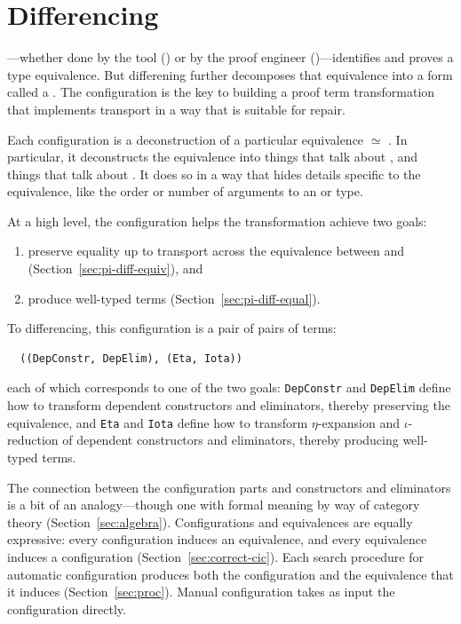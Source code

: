 \section{Differencing}
\label{sec:pi-diff}

---whether done by the tool () or by the proof engineer ()---identifies 
and proves a type equivalence. But differening further decomposes that equivalence into a form called a . 
The configuration is the key to building a proof term transformation that implements transport in a way that is suitable for repair.

Each configuration is a deconstruction of a particular equivalence \Aa $\simeq$ \B.
In particular, it deconstructs the equivalence into things that talk about \Aa, and things that talk about \B.
It does so in a way that hides details
specific to the equivalence, like the order or number of arguments to an  or type.

At a high level, the configuration helps the transformation achieve two goals: 

\begin{enumerate}
\item preserve equality up to transport across the equivalence between \Aa and \B (Section~\ref{sec:pi-diff-equiv}), and 
\item produce well-typed terms (Section~\ref{sec:pi-diff-equal}).
\end{enumerate}
To differencing, this configuration is a pair of pairs of terms:

\begin{lstlisting}
  ((DepConstr, DepElim), (Eta, Iota))
\end{lstlisting}
each of which corresponds to one of the two goals:
\lstinline{DepConstr} and \lstinline{DepElim} define how to transform dependent constructors and eliminators, thereby preserving the equivalence, and 
\lstinline{Eta} and \lstinline{Iota} define how to transform $\eta$-expansion and $\iota$-reduction of dependent constructors and eliminators, thereby producing well-typed terms.

The connection between the configuration parts and constructors and eliminators is a bit of an analogy---though one with formal meaning by way of
category theory (Section~\ref{sec:algebra}).
Configurations and equivalences are equally expressive: every configuration induces an equivalence, and every equivalence induces a configuration
(Section~\ref{sec:correct-cic}).
Each search procedure for automatic configuration produces both the configuration and the equivalence that it induces (Section~\ref{sec:proc}).
Manual configuration takes as input the configuration directly.

